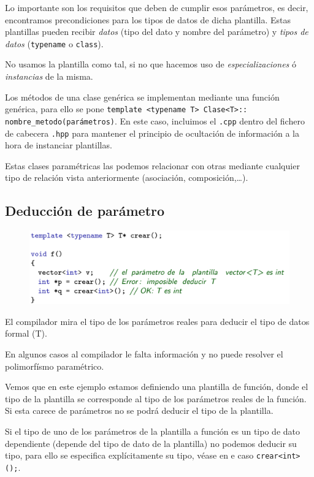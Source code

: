 Lo importante son los requisitos que deben de cumplir esos parámetros, es decir, encontramos precondiciones para los tipos de datos de dicha plantilla. Estas plantillas pueden recibir \textit{datos} (tipo del dato y nombre del parámetro) y \textit{tipos de datos} (\texttt{typename} o \texttt{class}).

No usamos la plantilla como tal, si no que hacemos uso de \textit{especializaciones} ó \textit{instancias} de la misma.

Los métodos de una clase genérica se implementan mediante una función genérica, para ello se pone \texttt{template <typename T>\ Clase<T>:: nombre\_metodo(parámetros)}. En este caso, incluimos el \texttt{.cpp} dentro del fichero de cabecera \texttt{.hpp} para mantener el principio de ocultación de información a la hora de instanciar plantillas.

Estas clases paramétricas las podemos relacionar con otras mediante cualquier tipo de relación vista anteriormente (asociación, composición,…).

\subsection{Deducción de parámetro}

\begin{figure}[h]
	\begin{center}
		\includegraphics[width=\textwidth]{Imagenes/poli12.png}
	\end{center}
\end{figure}

El compilador mira el tipo de los parámetros reales para deducir el tipo de datos formal (T).

En algunos casos al compilador le falta información y no puede resolver el polimorfísmo paramétrico.

Vemos que en este ejemplo estamos definiendo una plantilla de función, donde el tipo de la plantilla se corresponde al tipo de los parámetros reales de la función. Si esta carece de parámetros no se podrá deducir el tipo de la plantilla.


Si el tipo de uno de los parámetros de la plantilla a función es un tipo de dato dependiente (depende del tipo de dato de la plantilla) no podemos deducir su tipo, para ello se especifica explícitamente su tipo, véase en e caso \texttt{crear<int>();}.

